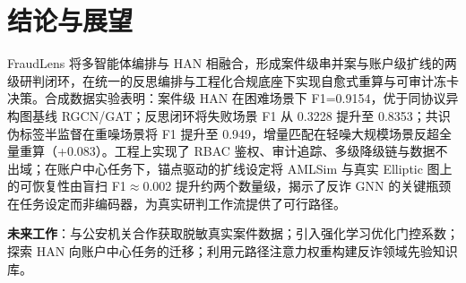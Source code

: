 \documentclass[12pt,a4paper,fontset=windows]{ctexart}
\begin{document}
\section{结论与展望}

FraudLens 将多智能体编排与 HAN 相融合，形成案件级串并案与账户级扩线的两级研判闭环，在统一的反思编排与工程化合规底座下实现自愈式重算与可审计冻卡决策。合成数据实验表明：案件级 HAN 在困难场景下 F1=0.9154，优于同协议异构图基线 RGCN/GAT；反思闭环将失败场景 F1 从 0.3228 提升至 0.8353；共识伪标签半监督在重噪场景将 F1 提升至 0.949，增量匹配在轻噪大规模场景反超全量重算（+0.083）。工程上实现了 RBAC 鉴权、审计追踪、多级降级链与数据不出域；在账户中心任务下，锚点驱动的扩线设定将 AMLSim 与真实 Elliptic 图上的可恢复性由盲扫 F1$\approx$0.002 提升约两个数量级，揭示了反诈 GNN 的关键瓶颈在任务设定而非编码器，为真实研判工作流提供了可行路径。

\textbf{未来工作}：与公安机关合作获取脱敏真实案件数据；引入强化学习优化门控系数；探索 HAN 向账户中心任务的迁移；利用元路径注意力权重构建反诈领域先验知识库。



\end{document}
